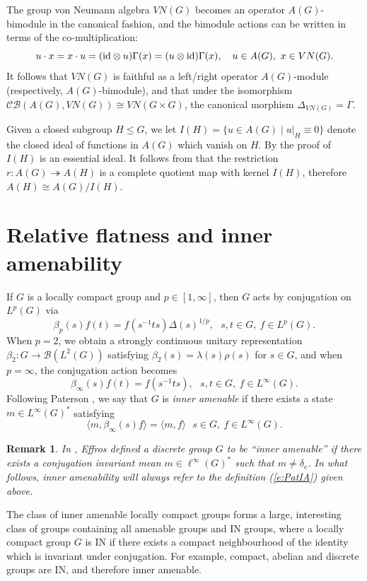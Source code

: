 \documentclass[preprint,12pt]{elsarticle}
\newtheorem{remark}[thm]{Remark}
\newcommand{\mc}[1]{\mathcal{#1}}
\newcommand{\e}[1]{\emph{#1}}
\newcommand{\la}{\langle}
\newcommand{\ra}{\rangle}
\newcommand{\LI}{L^{\infty}(G)}
\newcommand{\BLT}{\mc{B}(L^2(G))}
\newcommand{\lm}{\lambda}
\newcommand{\Gam}{\Gamma}
\newcommand{\ten}{\otimes}
\newcommand{\id}{\textnormal{id}}
\begin{document}
The group von Neumann algebra $VN(G)$ becomes an operator $A(G)$-bimodule in the canonical fashion, and the bimodule actions can be written in terms of the co-multiplication:
$$u\cdot x = x\cdot u = (\id\ten u)\Gam(x) = (u\ten\id)\Gam(x), \ \ \ u\in A(G), \ x\in VN(G).$$
It follows that $VN(G)$ is faithful as a left/right operator $A(G)$-module (respectively, $A(G)$-bimodule), and that under the isomorphism $\mc{CB}(A(G),VN(G))\cong VN(G\times G)$, the canonical morphism $\Delta_{VN(G)}=\Gam$.

Given a closed subgroup $H\leq G$, we let $I(H)=\{u\in A(G)\mid u|_{H}\equiv 0\}$ denote the closed ideal of functions in $A(G)$ which vanish on $H$. By the proof of \cite[Proposition 1.7]{ARS} $I(H)$ is an essential ideal. It follows from \cite{Herz} that the restriction $r:A(G)\twoheadrightarrow A(H)$ is a complete quotient map with kernel $I(H)$, therefore $A(H)\cong A(G)/I(H)$.


\section{Relative flatness and inner amenability}

If $G$ is a locally compact group and $p\in[1,\infty]$, then $G$ acts by conjugation on $L^p(G)$ via
$$\beta_p(s)f(t)=f(s^{-1}ts)\Delta(s)^{1/p}, \ \ \ s,t\in G, \ f\in L^p(G).$$
When $p=2$, we obtain a strongly continuous unitary representation $\beta_2:G\rightarrow\BLT$ satisfying $\beta_2(s)=\lm(s)\rho(s)$ for $s\in G$, and when $p=\infty$, the conjugation action becomes
$$\beta_\infty(s)f(t)=f(s^{-1}ts), \ \ \ s,t\in G, \ f\in\LI.$$
Following Paterson \cite[2.35.H]{Pat2}, we say that $G$ is \e{inner amenable} if there exists a state $m\in\LI^*$ satisfying
\begin{equation}\label{e:PatIA}\la m,\beta_{\infty}(s)f\ra=\la m,f\ra \ \ \ s\in G, \ f\in\LI.\end{equation}

\begin{remark} In \cite{Effros}, Effros defined a discrete group $G$ to be ``inner amenable'' if there exists a conjugation invariant mean $m\in\ell^{\infty}(G)^*$ such that $m\neq\delta_e$. In what follows, inner amenability will always refer to the definition (\ref{e:PatIA}) given above.\end{remark}

The class of inner amenable locally compact groups forms a large, interesting class of groups containing all amenable groups and IN groups, where a locally compact group $G$ is IN if there exists a compact neighbourhood of the identity which is invariant under conjugation. For example, compact, abelian and discrete groups are IN, and therefore inner amenable.
\end{document}
